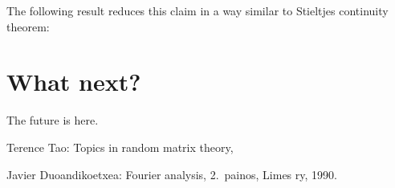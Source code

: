 \documentclass[12pt,a4paper,leqno]{report}
\theoremstyle{plain}
\theoremstyle{definition}
\theoremstyle{remark}
\begin{document}
The following result reduces this claim in a way similar to Stieltjes continuity theorem:

\chapter{What next?}\label{future}

The future is here.

\begin{thebibliography}{9}

Terence Tao: Topics in random matrix theory, 

Javier Duoandikoetxea: Fourier analysis, 2.\ painos, Limes ry, 1990.

\end{thebibliography}
\end{document}
